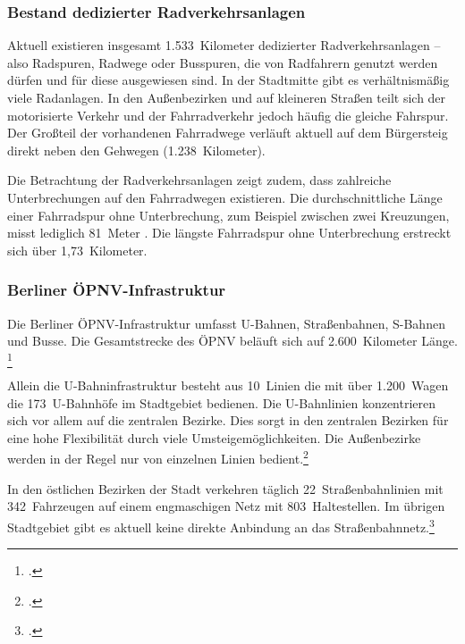 \subsubsection{Bestand dedizierter Radverkehrsanlagen}

Aktuell existieren insgesamt 1.533~Kilometer dedizierter Radverkehrsanlagen – also Radspuren, Radwege oder Busspuren, die von Radfahrern genutzt werden dürfen und für diese ausgewiesen sind. In der Stadtmitte gibt es verhältnismäßig viele Radanlagen. In den Außenbezirken und auf kleineren Straßen teilt sich der motorisierte Verkehr und der Fahrradverkehr jedoch häufig die gleiche Fahrspur. Der Großteil der vorhandenen Fahrradwege verläuft aktuell auf dem Bürgersteig direkt neben den Gehwegen (1.238~Kilometer).


Die Betrachtung der Radverkehrsanlagen zeigt zudem, dass zahlreiche Unterbrechungen auf den Fahrradwegen existieren. Die durchschnittliche Länge einer Fahrradspur ohne Unterbrechung, zum Beispiel zwischen zwei Kreuzungen, misst lediglich 81~Meter . Die längste Fahrradspur ohne Unterbrechung erstreckt sich über 1,73~Kilometer.

\subsubsection{Berliner ÖPNV-Infrastruktur}

Die Berliner ÖPNV-Infrastruktur umfasst U-Bahnen, Straßenbahnen, S-Bahnen und Busse. Die Gesamtstrecke des ÖPNV beläuft sich auf 2.600~Kilometer Länge. \footcite{BVG_daten}


Allein die U-Bahninfrastruktur besteht aus 10~Linien die mit über 1.200~Wagen die 173~U-Bahnhöfe im Stadtgebiet bedienen. Die U-Bahnlinien konzentrieren sich vor allem auf die zentralen Bezirke. Dies sorgt in den zentralen Bezirken für eine hohe Flexibilität durch viele Umsteigemöglichkeiten. Die Außenbezirke werden in der Regel nur von einzelnen Linien bedient.\footcite{BVG_daten}

In den östlichen Bezirken der Stadt verkehren täglich 22~Straßenbahnlinien mit 342~Fahrzeugen auf einem engmaschigen Netz mit 803~Haltestellen. Im übrigen Stadtgebiet gibt es aktuell keine direkte Anbindung an das Straßenbahnnetz.\footcite{BVG_daten}

